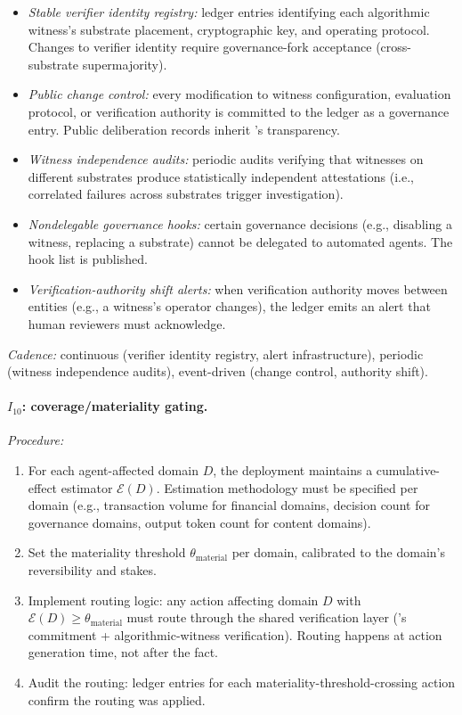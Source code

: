\begin{itemize}
\item \emph{Stable verifier identity registry:} ledger entries
  identifying each algorithmic witness's substrate placement,
  cryptographic key, and operating protocol. Changes to verifier
  identity require governance-fork acceptance (cross-substrate
  supermajority).
\item \emph{Public change control:} every modification to witness
  configuration, evaluation protocol, or verification authority
  is committed to the ledger as a governance entry. Public
  deliberation records inherit \citep[Exogenous~Verification]{lasser2026exo}'s transparency.
\item \emph{Witness independence audits:} periodic audits verifying
  that witnesses on different substrates produce statistically
  independent attestations (i.e., correlated failures across
  substrates trigger investigation).
\item \emph{Nondelegable governance hooks:} certain governance
  decisions (e.g., disabling a witness, replacing a substrate)
  cannot be delegated to automated agents. The hook list is
  published.
\item \emph{Verification-authority shift alerts:} when verification
  authority moves between entities (e.g., a witness's operator
  changes), the ledger emits an alert that human reviewers must
  acknowledge.
\end{itemize}

\emph{Cadence:} continuous (verifier identity registry, alert infrastructure),
periodic (witness independence audits), event-driven (change control, authority
shift).

\paragraph{\texorpdfstring{$I_{10}$}{I{10}}: coverage/materiality gating.}

\emph{Procedure:}
\begin{enumerate}
\item For each agent-affected domain $D$, the deployment maintains
  a cumulative-effect estimator $\mathcal{E}(D)$. Estimation
  methodology must be specified per domain (e.g., transaction
  volume for financial domains, decision count for governance
  domains, output token count for content domains).
\item Set the materiality threshold $\theta_{\mathrm{material}}$ per
  domain, calibrated to the domain's reversibility and stakes.
\item Implement routing logic: any action affecting domain $D$ with
  $\mathcal{E}(D) \geq \theta_{\mathrm{material}}$ must route through
  the shared verification layer (\citep[Exogenous~Verification]{lasser2026exo}'s commitment +
  algorithmic-witness verification). Routing happens at action
  generation time, not after the fact.
\item Audit the routing: ledger entries for each
  materiality-threshold-crossing action confirm the routing was
  applied.
\end{enumerate}

